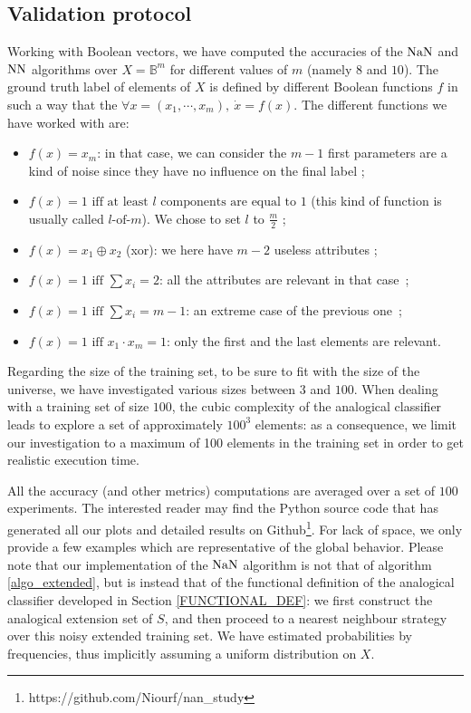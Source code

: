 {\subsection{Validation protocol}
Working with Boolean vectors, we have computed the accuracies of the $\mbox{NaN}$ and
$\mbox{NN}$ algorithms over $X=\mathbb{B}^m$ for different values of $m$ (namely $8$
and $10$). The ground truth label of elements of $X$ is
defined by different Boolean functions $f$ in such a way that the $\forall x =
(x_1, \cdots, x_m), ~ \dot{x} = f(x)$. The different functions we have worked
with are:
\begin{itemize}
\item $f(x)=x_m$: in that case, we can consider the $m-1$ first
  parameters are a kind of noise since they have no influence on the final
  label ;
\item $f(x) = 1 \mbox{ iff at least } l  \mbox{ components are equal
  to } 1$ (this kind of function is usually called $l\text{-of-}m$). We chose
  to set $l$ to $\frac{m}{2}$ ;
\item $f(x)= x_1 \oplus  x_2$ (xor): we here have $m-2$ useless attributes ;
\item $f(x)=1 \mbox { iff } \sum x_i =2$: all the attributes are relevant in
  that case~;
\item $f(x)=1 \mbox { iff } \sum x_i = m-1$: an extreme case of
  the previous one~;
\item $f(x)=1 \mbox { iff } x_1 \cdot x_m = 1$: only the first and
  the last elements are relevant.
\end{itemize}

Regarding the size of the training set, to be sure to fit with the size of the
universe, we have investigated various sizes between $3$ and $100$. When
dealing with a training set of size $100$, the cubic complexity of the
analogical classifier leads to explore a set of approximately $100^3$ elements:
as a consequence, we limit our investigation to a maximum of 100 elements in
the training set in order to get realistic execution time.

All the accuracy (and other metrics) computations are averaged over a set of
$100$ experiments.  The interested reader may find the Python source code that
has generated all our plots and detailed results on
Github\footnote{https://github.com/Niourf/nan\_study}. For lack of space,
we only provide a few examples which are representative of the global behavior.
Please note that our implementation of the $\mbox{NaN}$ algorithm is not that of
algorithm \ref{algo_extended}, but is instead that of the functional definition
of the analogical classifier developed in Section \ref{FUNCTIONAL_DEF}: we
first construct the analogical extension set of $S$, and then proceed to a
nearest neighbour strategy over this noisy extended training set. We have
estimated probabilities by frequencies, thus implicitly assuming a uniform
distribution on $X$.

}
